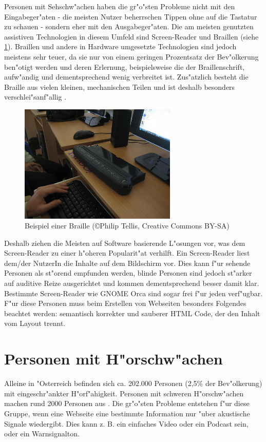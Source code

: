 \documentclass[a4paper,bibtotoc,oneside]{scrbook}
\begin{document}
Personen mit Sehschw"achen haben die gr"o"sten Probleme nicht mit den Eingabeger"aten - die meisten Nutzer beherrschen Tippen ohne auf die Tastatur zu schauen - sondern eher mit den Ausgabeger"aten. Die am meisten genutzten assistiven Technologien in diesem Umfeld sind Screen-Reader und Braillen (siehe \ref{Abb1}). Braillen und andere in Hardware umgesetzte Technologien sind jedoch meistens sehr teuer, da sie nur von einem geringen Prozentsatz der Bev"olkerung ben"otigt werden und deren Erlernung, beispielsweise die der Braillenschrift, aufw"andig und dementsprechend wenig verbreitet ist\cite[S. 249-250]{screen_read_frust}.
Zus"atzlich besteht die Braille aus vielen kleinen, mechanischen Teilen und ist deshalb besonders verschlei"sanf"allig \cite[S. 11]{barr_webd}.

\begin{figure}[braille]
\centering
\includegraphics[width=75mm]{braille}
\caption[Beispiel einer Braille]{Beispiel einer Braille (\copyright  Philip Tellis, Creative Commons BY-SA)}\label{Abb1}
\end{figure}

Deshalb ziehen die Meisten auf Software basierende L"osungen vor, was dem Screen-Reader zu einer h"oheren Popularit"at verhilft\cite[S. 249-250]{screen_read_frust}. Ein Screen-Reader liest dem/der NutzerIn die Inhalte auf dem Bildschirm vor. Dies kann f"ur sehende Personen als st"orend empfunden werden, blinde Personen sind jedoch st"arker auf auditive Reize ausgerichtet und kommen dementsprechend besser damit klar\cite[S. 13]{barr_webd}. Bestimmte Screen-Reader wie GNOME Orca \cite{orca} sind sogar frei f"ur jeden verf"ugbar. 
F"ur diese Personen muss beim Erstellen von Webseiten besonders Folgendes beachtet werden: semantisch korrekter und sauberer HTML Code, der den Inhalt vom Layout trennt.\cite[S. 13-15]{barr_webd}

\section{Personen mit H"orschw"achen}
Alleine in "Osterreich befinden sich ca. 202.000 Personen (2,5\% der Bev"olkerung) mit eingeschr"ankter H"orf"ahigkeit. Personen mit schweren H"orschw"achen machen rund 2000 Personen aus \cite[S. 13-14]{stat_austria}. Die gr"o"sten Probleme entstehen f"ur diese Gruppe, wenn eine Webseite eine bestimmte Information nur "uber akustische Signale wiedergibt. Dies kann z. B. ein einfaches Video oder ein Podcast sein, oder ein Warnsignalton. \cite[S. 17]{barr_webd}\cite[S. 20]{understand_acc}
\end{document}

